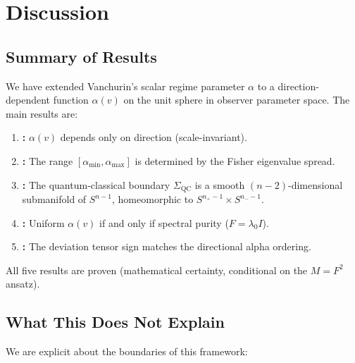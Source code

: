 \documentclass[11pt,a4paper]{article}
\theoremstyle{plain}
\theoremstyle{definition}
\newcommand{\Sn}{S^{n-1}}
\newcommand{\SigmaQC}{\Sigma_{\mathrm{QC}}}
\begin{document}

\section{Discussion}
\label{sec:discussion}

\subsection{Summary of Results}

We have extended Vanchurin's scalar regime parameter $\alpha$ to a
direction-dependent function $\alpha(v)$ on the unit sphere in
observer parameter space.  The main results are:

\begin{enumerate}[noitemsep]
\item \textbf{:} $\alpha(v)$ depends
  only on direction (scale-invariant).

\item \textbf{:} The range
  $[\alpha_{\min}, \alpha_{\max}]$ is determined by the Fisher
  eigenvalue spread.

\item \textbf{:} The quantum-classical
  boundary $\SigmaQC$ is a smooth $(n-2)$-dimensional submanifold
  of $\Sn$, homeomorphic to $S^{n_+-1} \times S^{n_--1}$.

\item \textbf{:} Uniform $\alpha(v)$ if
  and only if spectral purity ($F = \lambda_0 I$).

\item \textbf{:} The deviation tensor sign
  matches the directional alpha ordering.
\end{enumerate}

All five results are proven (mathematical certainty, conditional
on the $M = F^2$ ansatz).

\subsection{What This Does Not Explain}

We are explicit about the boundaries of this framework:
\end{document}
